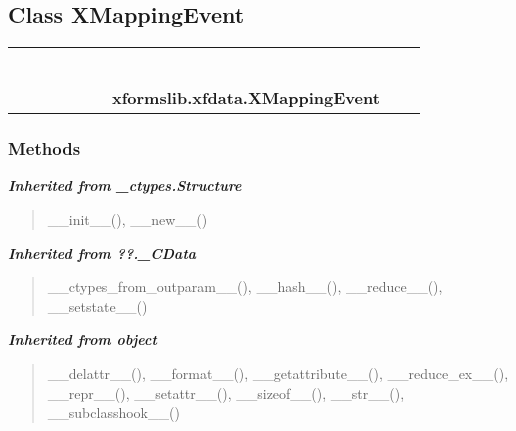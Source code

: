\subsection{Class XMappingEvent}

    \label{xformslib:xfdata:XMappingEvent}
\begin{tabular}{cccccccccc}
\multicolumn{2}{r}{\settowidth{\BCL}{object}\multirow{2}{\BCL}{object}}
&&
&&
&&
  \\\cline{3-3}
  &&\multicolumn{1}{c|}{}
&&
&&
&&
  \\
\multicolumn{4}{r}{\settowidth{\BCL}{??.\_CData}\multirow{2}{\BCL}{??.\_CData}}
&&
&&
  \\\cline{5-5}
  &&&&\multicolumn{1}{c|}{}
&&
&&
  \\
\multicolumn{6}{r}{\settowidth{\BCL}{\_ctypes.Structure}\multirow{2}{\BCL}{\_ctypes.Structure}}
&&
  \\\cline{7-7}
  &&&&&&\multicolumn{1}{c|}{}
&&
  \\
&&&&&&\multicolumn{2}{l}{\textbf{xformslib.xfdata.XMappingEvent}}
\end{tabular}



  \subsubsection{Methods}


\large{\textbf{\textit{Inherited from \_ctypes.Structure}}}

\begin{quote}
\_\_init\_\_(), \_\_new\_\_()
\end{quote}

\large{\textbf{\textit{Inherited from ??.\_CData}}}

\begin{quote}
\_\_ctypes\_from\_outparam\_\_(), \_\_hash\_\_(), \_\_reduce\_\_(), \_\_setstate\_\_()
\end{quote}

\large{\textbf{\textit{Inherited from object}}}

\begin{quote}
\_\_delattr\_\_(), \_\_format\_\_(), \_\_getattribute\_\_(), \_\_reduce\_ex\_\_(), \_\_repr\_\_(), \_\_setattr\_\_(), \_\_sizeof\_\_(), \_\_str\_\_(), \_\_subclasshook\_\_()
\end{quote}

